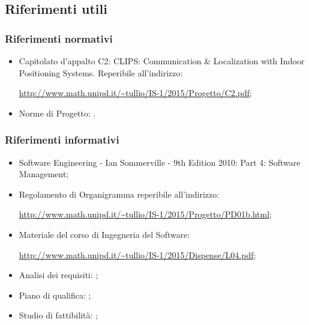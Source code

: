 \documentclass[../PianoProgetto.tex]{subfiles}
\begin{document}
	\subsection{Riferimenti utili}

		\subsubsection{Riferimenti normativi}
		\begin{itemize}
		\item Capitolato d'appalto C2: CLIPS: Communication \& Localization with Indoor Positioning Systems. Reperibile all'indirizzo: \par
			\url{http://www.math.unipd.it/~tullio/IS-1/2015/Progetto/C2.pdf};
		\item Norme di Progetto: \normediprogettov.
		\end{itemize}

		\subsubsection{Riferimenti informativi}
		\begin{itemize}
		\item Software Engineering - Ian Sommerville - 9th Edition 2010:  Part 4: Software Management;
		\item Regolamento di Organigramma reperibile all'indirizzo: \par
			\url{http://www.math.unipd.it/~tullio/IS-1/2015/Progetto/PD01b.html};
		\item Materiale del corso di Ingegneria del Software: \par
			\url{http://www.math.unipd.it/~tullio/IS-1/2015/Dispense/L04.pdf};
		\item Analisi dei requisiti: \analisideirequisitiv ;
		\item Piano di qualifica: \pianodiqualificav ;
		\item Studio di fattibilità: \studiodifattibilitav ;
		\end{itemize}
			
\end{document}
